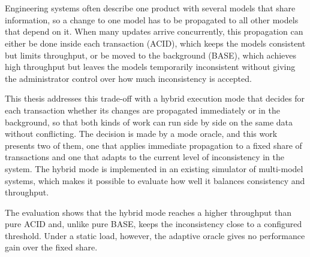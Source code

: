 \chapter{\abstractname}

Engineering systems often describe one product with several models that share
information, so a change to one model has to be propagated to all other models
that depend on it. When many updates arrive concurrently, this propagation can
either be done inside each transaction (ACID), which keeps the models consistent
but limits throughput, or be moved to the background (BASE), which achieves high
throughput but leaves the models temporarily inconsistent without giving the
administrator control over how much inconsistency is accepted.

This thesis addresses this trade-off with a hybrid execution mode that decides
for each transaction whether its changes are propagated immediately or in the
background, so that both kinds of work can run side by side on the same data
without conflicting. The decision is made by a mode oracle, and this work
presents two of them, one that applies immediate propagation to a fixed share of
transactions and one that adapts to the current level of inconsistency in the
system. The hybrid mode is implemented in an existing simulator of multi-model
systems, which makes it possible to evaluate how well it balances consistency
and throughput.

The evaluation shows that the hybrid mode reaches a higher
throughput than pure ACID and, unlike pure BASE, keeps the inconsistency close
to a configured threshold. Under a static load, however, the adaptive oracle
gives no performance gain over the fixed share.


\makeatletter
{}
{\renewcommand{\abstractname}{Kurzfassung}}
{\renewcommand{\abstractname}{Abstract}}
\makeatother

\chapter{\abstractname}

